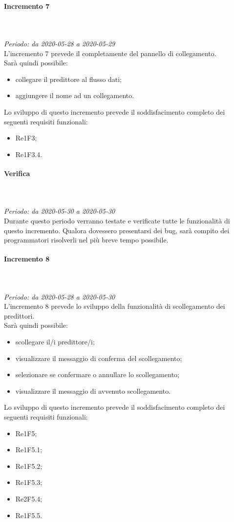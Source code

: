 \paragraph{Incremento 7}\mbox{} \\ \mbox{} \\ 
\textit{Periodo: da 2020-05-28 a 2020-05-29}\\
L’incremento 7 prevede il completamente del pannello di collegamento. \\
Sarà quindi possibile:
\begin{itemize}
	\item collegare il predittore al flusso dati;
	\item aggiungere il nome ad un collegamento.
\end{itemize}
Lo sviluppo di questo incremento prevede il soddisfacimento completo dei seguenti requisiti funzionali:
\begin{itemize}
\item Re1F3;
\item Re1F3.4.
\end{itemize}
\paragraph*{Verifica}\mbox{} \\ \mbox{} \\ 
\textit{Periodo: da 2020-05-30 a 2020-05-30}\\
Durante questo periodo verranno testate e verificate tutte le funzionalità di questo incremento. Qualora dovessero presentarsi dei bug, sarà compito dei programmatori risolverli nel più breve tempo possibile.

\paragraph{Incremento 8}\mbox{} \\ \mbox{} \\ 
\textit{Periodo: da 2020-05-28 a 2020-05-30}\\
L’incremento 8 prevede lo sviluppo della funzionalità di scollegamento dei predittori.\\
Sarà quindi possibile:
\begin{itemize}
	\item scollegare il/i predittore/i;
	\item visualizzare il messaggio di conferma del scollegamento;
	\item selezionare se confermare o annullare lo scollegamento;
	\item visualizzare il messaggio di avvenuto scollegamento.
\end{itemize}
Lo sviluppo di questo incremento prevede il soddisfacimento completo dei seguenti requisiti funzionali:
\begin{itemize}
\item Re1F5;
\item Re1F5.1;
\item Re1F5.2;
\item Re1F5.3;
\item Re2F5.4;
\item Re1F5.5.
\end{itemize}
